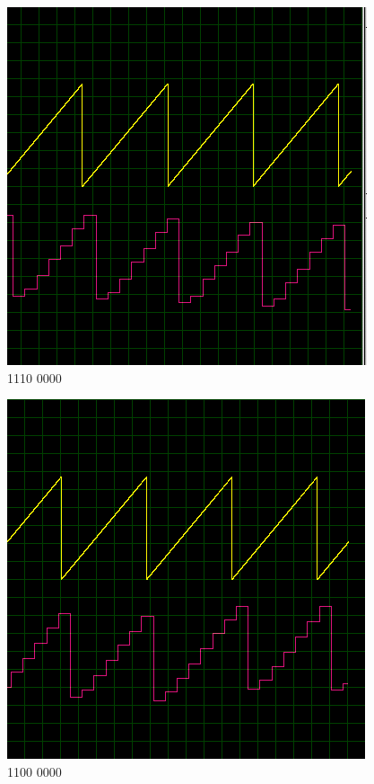\begin{multicols}{2}
\begin{figure}[H]
\includegraphics[width=0.8\linewidth]{ImagenesEjercicio1/bit5.png}
\caption{1110 0000}
\end{figure}
\begin{figure}[H]
\centering
\includegraphics[width=0.8\linewidth]{ImagenesEjercicio1/bit6.png}
\caption{1100 0000}
\end{figure}
\begin{figure}[H]
\centering

\end{figure}
\end{multicols}
